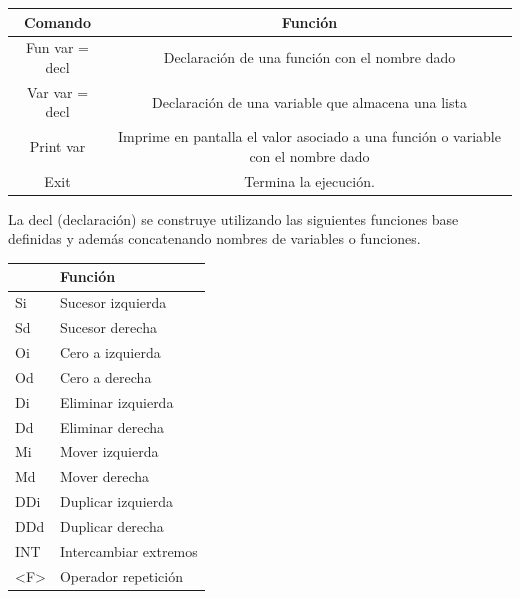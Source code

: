 \documentclass[a4paper,13pt,proof]{article}
\theoremstyle{mytheor}
\begin{document}
\begin{table}[h]
\centering
\begin{tabular}{|c|c|}
\hline
Comando        & Función                                                                           \\ \hline
Fun var = decl & Declaración de una función con el nombre dado                                     \\ \hline
Var var = decl & Declaración de una variable que almacena una lista                                \\ \hline
Print var      & Imprime en pantalla el valor asociado a una función o variable con el nombre dado \\ \hline
Exit           & Termina la ejecución.                                                             \\ \hline
\end{tabular}
\end{table}

La decl (declaración) se construye utilizando las siguientes funciones base definidas y además concatenando nombres de variables o funciones.

\begin{table}[H]
\centering
\begin{tabular}{|l|l|}
\hline
\multicolumn{1}{|c|}{}     & Función               \\ \hline
Si                         & Sucesor izquierda     \\ \hline
Sd                         & Sucesor derecha       \\ \hline
Oi                         & Cero a izquierda      \\ \hline
Od                         & Cero a derecha        \\ \hline
Di                         & Eliminar izquierda    \\ \hline
Dd                         & Eliminar derecha      \\ \hline
Mi                         & Mover izquierda       \\ \hline
Md                         & Mover derecha         \\ \hline
DDi                        & Duplicar izquierda    \\ \hline
DDd                        & Duplicar derecha      \\ \hline
INT                        & Intercambiar extremos \\ \hline
\textless{}F\textgreater{} & Operador repetición   \\ \hline
\end{tabular}
\end{table}
\end{document}
